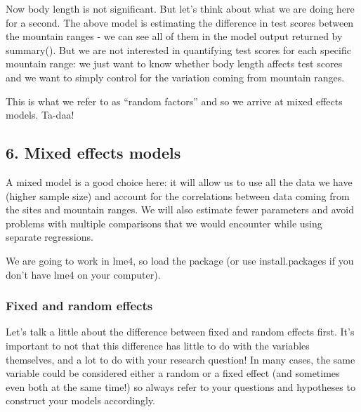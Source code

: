 \documentclass[
]{article}
\begin{document}
Now body length is not significant. But let's think about what we are
doing here for a second. The above model is estimating the difference in
test scores between the mountain ranges - we can see all of them in the
model output returned by summary(). But we are not interested in
quantifying test scores for each specific mountain range: we just want
to know whether body length affects test scores and we want to simply
control for the variation coming from mountain ranges.

This is what we refer to as ``random factors'' and so we arrive at mixed
effects models. Ta-daa!

\subsection{6. Mixed effects models}\label{mixed-effects-models}

A mixed model is a good choice here: it will allow us to use all the
data we have (higher sample size) and account for the correlations
between data coming from the sites and mountain ranges. We will also
estimate fewer parameters and avoid problems with multiple comparisons
that we would encounter while using separate regressions.

We are going to work in lme4, so load the package (or use
install.packages if you don't have lme4 on your computer).

\subsubsection{Fixed and random effects}\label{fixed-and-random-effects}

Let's talk a little about the difference between fixed and random
effects first. It's important to not that this difference has little to
do with the variables themselves, and a lot to do with your research
question! In many cases, the same variable could be considered either a
random or a fixed effect (and sometimes even both at the same time!) so
always refer to your questions and hypotheses to construct your models
accordingly.
\end{document}
